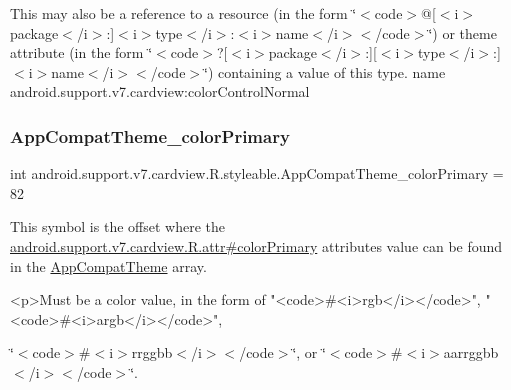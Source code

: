 This may also be a reference to a resource (in the form \char`\"{}$<$code$>$@\mbox{[}$<$i$>$package$<$/i$>$\+:\mbox{]}$<$i$>$type$<$/i$>$\+:$<$i$>$name$<$/i$>$$<$/code$>$\char`\"{}) or theme attribute (in the form \char`\"{}$<$code$>$?\mbox{[}$<$i$>$package$<$/i$>$\+:\mbox{]}\mbox{[}$<$i$>$type$<$/i$>$\+:\mbox{]}$<$i$>$name$<$/i$>$$<$/code$>$\char`\"{}) containing a value of this type.  name android.\+support.\+v7.\+cardview\+:color\+Control\+Normal \mbox{\label{classandroid_1_1support_1_1v7_1_1cardview_1_1R_1_1styleable_a1ded3a190d020f33c8807adef684cbee}} 
\subsubsection{\texorpdfstring{App\+Compat\+Theme\+\_\+color\+Primary}{AppCompatTheme\_colorPrimary}}
{\footnotesize\ttfamily int android.\+support.\+v7.\+cardview.\+R.\+styleable.\+App\+Compat\+Theme\+\_\+color\+Primary = 82\hspace{0.3cm}{\ttfamily [static]}}

This symbol is the offset where the \hyperlink{classandroid_1_1support_1_1v7_1_1cardview_1_1R_1_1attr_a5c781c3fb7e3cdf20c9e9975e9b8b63f}{android.\+support.\+v7.\+cardview.\+R.\+attr\#color\+Primary} attribute\textquotesingle{}s value can be found in the \hyperlink{classandroid_1_1support_1_1v7_1_1cardview_1_1R_1_1styleable_a52e6f69f954ecc2622d72c0b4d298938}{App\+Compat\+Theme} array.

\begin{DoxyVerb}      <p>Must be a color value, in the form of "<code>#<i>rgb</i></code>", "<code>#<i>argb</i></code>",
\end{DoxyVerb}
 \char`\"{}$<$code$>$\#$<$i$>$rrggbb$<$/i$>$$<$/code$>$\char`\"{}, or \char`\"{}$<$code$>$\#$<$i$>$aarrggbb$<$/i$>$$<$/code$>$\char`\"{}. 

